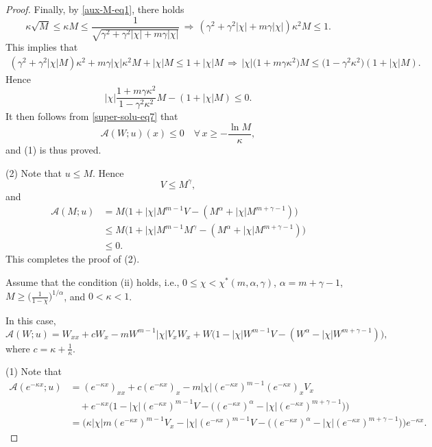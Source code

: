 \documentclass[11pt]{article} %
\theoremstyle{remark}
\theoremstyle{remark}
\numberwithin{equation}{section}
\numberwithin{figure}{section}
\numberwithin{table}{section}
\begin{document}
\begin{proof}
Finally, by \eqref{aux-M-eq1}, there holds 
$$
\kappa\sqrt M\le \kappa M \le   \frac{1}{\sqrt {\gamma^2+\gamma^2|\chi|+m\gamma |\chi|}}\,\Longrightarrow\, (\gamma^2+\gamma^2|\chi|+m\gamma|\chi|)\kappa^2 M  \le 1.
$$
This implies that
\begin{align*}
(\gamma^2+\gamma^2|\chi|M)\kappa^2+m\gamma|\chi|\kappa^2 M  +|\chi| M\le 1+|\chi| M\, \Longrightarrow\,
|\chi|\big(1+m\gamma\kappa^2\big)M\le \big(1-\gamma^2\kappa^2\big)(1+|\chi|M).
\end{align*}
Hence
$$
 |\chi| \frac{1+m \gamma \kappa^2}{1-\gamma^2 \kappa ^2} M -(1+|\chi| M)\le 0.
$$
It then follows from  \eqref{super-solu-eq7} that
$$
\mathcal{A}(W;u)(x)\le 0\quad \forall\, x\ge -\frac{\ln M}{\kappa},
$$
and (1) is thus proved.

\smallskip

(2)  Note that $u\le M$. Hence 
$$
V\le M^\gamma,
$$
and
\begin{align*}
\mathcal{A}(M;u)&=M \big(1+|\chi| M^{m-1} V -(M^\alpha +|\chi| M^{m+\gamma-1})\big)\\
&\le M \big(1+|\chi| M^{m-1} M^\gamma  -(M^\alpha +|\chi| M^{m+\gamma-1})\big)\\
&\le 0.
\end{align*}
This completes the proof of (2).



\smallskip


 Assume that the condition (ii) holds, i.e., $0\le \chi<\chi^*(m,\alpha,\gamma)$,  $\alpha=  m+\gamma-1$, 
$M\ge \Big(\frac{1}{1-\chi}\Big)^{1/\alpha}$, and  $0<\kappa <1$. 


\smallskip


In this case,
$$
\mathcal{A}(W;u)=W_{xx}+cW_x- m W^{m-1} |\chi| V_x W_x + W\big(1- |\chi|W^{m-1} V -(W^\alpha -|\chi| W^{m+\gamma-1})\big),
$$
where $c=\kappa+\frac{1}{\kappa}$.


(1)  
Note that
\begin{align*}
\mathcal{A}( e^{-\kappa x};u)
&=  (e^{-\kappa x})_{xx}+c (e^{-\kappa x})_x - m |\chi|(e^{-\kappa x})^{m-1}  (e^{-\kappa x})_xV_x \\
&\quad + e^{-\kappa x}\Big(
1-  |\chi| (e^{-\kappa x})^{m-1} V-\big(( e^{- \kappa x})^\alpha-|\chi| (e^{-\kappa x})^{m+\gamma-1}\big)\Big)\\
&= \Big(\kappa |\chi| m  (e^{-\kappa x})^{m-1} V_x- |\chi|(e^{-\kappa x})^{m-1} V -\big(( e^{- \kappa x})^\alpha-|\chi| (e^{-\kappa x})^{m+\gamma-1}\big)\Big)e^{-\kappa x}.
\end{align*}





\end{proof}
\end{document}
